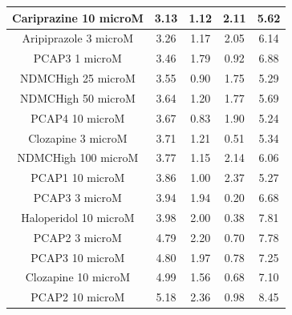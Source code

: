 \documentclass[a4paper,12pt]{article}
\begin{document}
\begin{table}[h!]
\begin{tabular}{|c|c|c|c|c|}
Cariprazine 10 microM  & 3.13 & 1.12 & 2.11 & 5.62 \\ \hline
Aripiprazole 3 microM  & 3.26 & 1.17 & 2.05 & 6.14 \\ \hline
PCAP3 1 microM       & 3.46 & 1.79 & 0.92 & 6.88 \\ \hline
NDMCHigh 25 microM     & 3.55 & 0.90  & 1.75 & 5.29 \\ \hline
NDMCHigh 50 microM     & 3.64 & 1.20  & 1.77 & 5.69 \\ \hline
PCAP4 10 microM      & 3.67 & 0.83 & 1.90  & 5.24 \\ \hline
Clozapine 3 microM     & 3.71 & 1.21 & 0.51 & 5.34 \\ \hline
NDMCHigh 100 microM    & 3.77 & 1.15 & 2.14 & 6.06 \\ \hline
PCAP1 10 microM        & 3.86 & 1.00    & 2.37 & 5.27 \\ \hline
PCAP3 3 microM       & 3.94 & 1.94 & 0.20  & 6.68 \\ \hline
Haloperidol 10 microM  & 3.98 & 2.00    & 0.38 & 7.81 \\ \hline
PCAP2 3 microM         & 4.79 & 2.20  & 0.70  & 7.78 \\ \hline
PCAP3 10 microM      & 4.80  & 1.97 & 0.78 & 7.25 \\ \hline
Clozapine 10 microM    & 4.99 & 1.56 & 0.68 & 7.10  \\ \hline
PCAP2 10 microM        & 5.18 & 2.36 & 0.98 & 8.45 \\ \hline
\end{tabular}
\end{table}
\newpage
\end{document}
